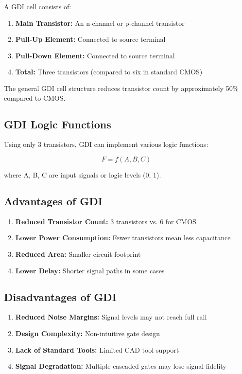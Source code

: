 \documentclass[12pt,a4paper,twoside]{report}
\begin{document}
A GDI cell consists of:

\begin{enumerate}
    \item \textbf{Main Transistor:} An n-channel or p-channel transistor
    \item \textbf{Pull-Up Element:} Connected to source terminal
    \item \textbf{Pull-Down Element:} Connected to source terminal
    \item \textbf{Total:} Three transistors (compared to six in standard CMOS)
\end{enumerate}

The general GDI cell structure reduces transistor count by approximately 50\% compared to CMOS.

\subsection{GDI Logic Functions}

Using only 3 transistors, GDI can implement various logic functions:

\begin{equation}
F = f(A, B, C)
\end{equation}

where A, B, C are input signals or logic levels (0, 1).

\subsection{Advantages of GDI}

\begin{enumerate}
    \item \textbf{Reduced Transistor Count:} 3 transistors vs. 6 for CMOS
    \item \textbf{Lower Power Consumption:} Fewer transistors mean less capacitance
    \item \textbf{Reduced Area:} Smaller circuit footprint
    \item \textbf{Lower Delay:} Shorter signal paths in some cases
\end{enumerate}

\subsection{Disadvantages of GDI}

\begin{enumerate}
    \item \textbf{Reduced Noise Margins:} Signal levels may not reach full rail
    \item \textbf{Design Complexity:} Non-intuitive gate design
    \item \textbf{Lack of Standard Tools:} Limited CAD tool support
    \item \textbf{Signal Degradation:} Multiple cascaded gates may lose signal fidelity
\end{enumerate}
\end{document}
